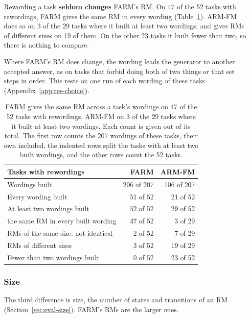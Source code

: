 \documentclass[11pt,english,listoffigures,listoftables]{tfgetsinf}
\begin{document}
Rewording a task \textbf{seldom changes} FARM's RM. On 47 of the 52 tasks with rewordings, FARM gives the same RM in every wording (Table~\ref{tab:res-rewording}). ARM-FM does so on 3 of the 29 tasks where it built at least two wordings, and gives RMs of different sizes on 19 of them. On the other 23 tasks it built fewer than two, so there is nothing to compare.

Where FARM's RM does change, the wording leads the generator to another accepted answer, as on tasks that forbid doing both of two things or that set steps in order. This rests on one run of each wording of these tasks (Appendix~\ref{app:res-choice}).

\begin{table}[H]
\centering
\footnotesize
\renewcommand{\arraystretch}{1.2}
\begin{tabular}{@{}lrr@{}}
\toprule
\textbf{Tasks with rewordings} & \textbf{FARM} & \textbf{ARM-FM} \\ \midrule
Wordings built & 206 of 207 & 106 of 207 \\
Every wording built & 51 of 52 & 21 of 52 \\
At least two wordings built & 52 of 52 & 29 of 52 \\
\quad the same RM in every built wording & 47 of 52 & 3 of 29 \\
\quad RMs of the same size, not identical & 2 of 52 & 7 of 29 \\
\quad RMs of different sizes & 3 of 52 & 19 of 29 \\
Fewer than two wordings built & 0 of 52 & 23 of 52 \\ \bottomrule
\end{tabular}
\caption[RMs across rewordings]{FARM gives the same RM across a task's wordings on 47 of the 52 tasks with rewordings, ARM-FM on 3 of the 29 tasks where it built at least two wordings. Each count is given out of its total. The first row counts the 207 wordings of these tasks, their own included, the indented rows split the tasks with at least two built wordings, and the other rows count the 52 tasks.}
\label{tab:res-rewording}
\end{table}

\subsubsection{Size}
The third difference is size, the number of states and transitions of an RM (Section~\ref{sec:eval-size}). FARM's RMs are the larger ones.
\end{document}

